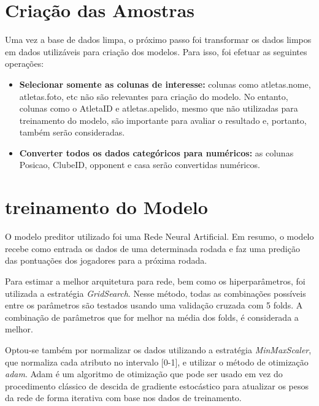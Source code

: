 \documentclass[conference]{IEEEtran}
\begin{document}
\section{Criação das Amostras}

Uma vez  a base de  dados limpa, o  próximo passo foi  transformar os
dados limpos  em dados utilizáveis  para criação dos  modelos. Para
isso, foi efetuar as seguintes operações:

\begin{itemize}

\item  \textbf{Selecionar somente  as colunas  de interesse:}  colunas
como  atletas.nome,  atletas.foto,  etc   não  são  relevantes  para
criação  do   modelo.  No  entanto,   colunas  como  o   AtletaID  e
atletas.apelido, mesmo que não utilizadas para treinamento do modelo,
são importante para  avaliar o resultado e,  portanto, também serão
consideradas.

\item \textbf{Converter todos os  dados categóricos para numéricos:}
as  colunas  Posicao,  ClubeID,  opponent e  casa  serão  convertidas
numéricos.

\end{itemize}


\section{treinamento do Modelo}

O modelo preditor utilizado foi uma Rede Neural Artificial. Em resumo,
o modelo recebe como entrada os  dados de uma determinada rodada e faz
uma predição das pontuações dos jogadores para a próxima rodada.

Para   estimar  a   melhor  arquitetura   para  rede,   bem  como   os
hiperparâmetros,  foi  utilizada a  estratégia  \textit{GridSearch}.
Nesse método, todas as  combinações possíveis entre os parâmetros
são  testados  usando   uma  validação  cruzada  com   5  folds.  A
combinação de  parâmetros que  for melhor na  média dos  folds, é
considerada a melhor.

Optou-se  também por  normalizar  os dados  utilizando a  estratégia
\textit{MinMaxScaler}, que normaliza cada atributo no intervalo [0-1],
e  utilizar  o  método  de otimização  \textit{adam}.  Adam  é  um
algoritmo de  otimização que pode  ser usado em vez  do procedimento
clássico de descida de gradiente estocástico para atualizar os pesos
da rede de forma iterativa com base nos dados de treinamento.
\end{document}
